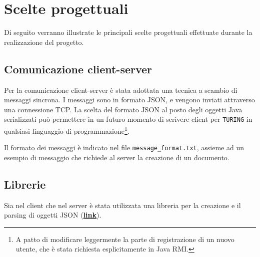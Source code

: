 \section{Scelte progettuali}
Di seguito verranno illustrate le principali scelte progettuali effettuate durante la realizzazione del progetto.





\subsection{Comunicazione client-server}
Per la comunicazione client-server è stata adottata una tecnica a scambio di messaggi sincrona. I messaggi sono in formato JSON, e vengono inviati attraverso una connessione TCP. La scelta del formato JSON al posto degli oggetti Java serializzati può permettere in un futuro momento di scrivere client per \texttt{TURING} in qualsiasi linguaggio di programmazione\footnote{A patto di modificare leggermente la parte di registrazione di un nuovo utente, che è stata richiesta esplicitamente in Java RMI.}.

\medskip

Il formato dei messaggi è indicato nel file \texttt{message\_format.txt}, assieme ad un esempio di messaggio che richiede al server la creazione di un documento.

\subsection{Librerie}
Sia nel client che nel server è stata utilizzata una libreria per la creazione e il parsing di oggetti JSON (\href{https://mvnrepository.com/artifact/org.json/json}{\textbf{link}}).
